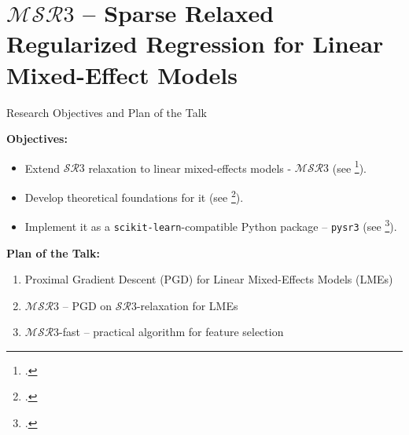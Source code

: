 \documentclass[8pt]{beamer}
\begin{document}
\section{\texorpdfstring{$\mathcal{MSR}3$}{MSR3} -- Sparse Relaxed Regularized Regression for Linear Mixed-Effect Models}

\begin{frame}{Research Objectives and Plan of the Talk}
	
\textbf{Objectives:}
\begin{itemize}
	\item Extend $\mathcal{SR}3$ relaxation to linear mixed-effects models - $\mathcal{MSR}3$ (see \footcite{sholokhov2022relaxation}).
	\item Develop theoretical foundations for it (see \footcite{aravkin2022jimtheory}).
	\item Implement it as a \texttt{scikit-learn}-compatible Python package -- \texttt{pysr3} (see \footcite{sholokhov2023pysr3}).
\end{itemize}

\vspace{3em}

\textbf{Plan of the Talk:}
\begin{enumerate}
	\item Proximal Gradient Descent (PGD) for Linear Mixed-Effects Models (LMEs)
	\item $\mathcal{MSR}3$ --  PGD on $\mathcal{SR}3$-relaxation for LMEs
	\item $\mathcal{MSR}3$-fast -- practical algorithm for feature selection
\end{enumerate}
\end{frame}
\end{document}

